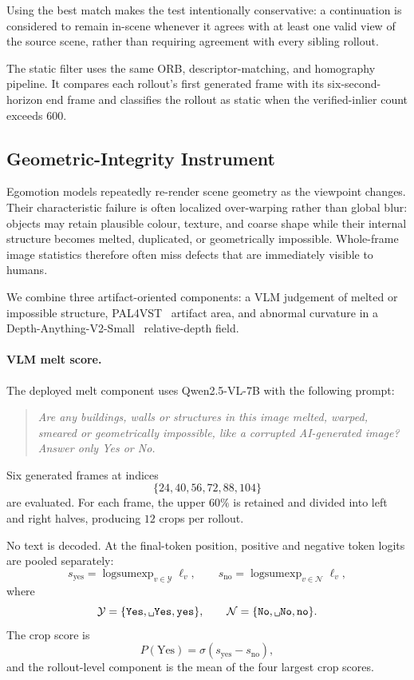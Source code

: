 \documentclass[letterpaper]{article} %
\begin{document}
Using the best match makes the test intentionally conservative: a continuation
is considered to remain in-scene whenever it agrees with at least one valid
view of the source scene, rather than requiring agreement with every sibling
rollout.

The static filter uses the same ORB, descriptor-matching, and homography
pipeline. It compares each rollout's first generated frame with its
six-second-horizon end frame and classifies the rollout as static when the
verified-inlier count exceeds $600$.


\subsection{Geometric-Integrity Instrument}
\label{app:geometry_instrument}

Egomotion models repeatedly re-render scene geometry as the viewpoint changes.
Their characteristic failure is often localized over-warping rather than
global blur: objects may retain plausible colour, texture, and coarse shape
while their internal structure becomes melted, duplicated, or geometrically
impossible. Whole-frame image statistics therefore often miss defects that
are immediately visible to humans.

We combine three artifact-oriented components: a VLM judgement of melted or
impossible structure, PAL4VST~\cite{pal} artifact area, and abnormal curvature
in a Depth-Anything-V2-Small~\cite{depthanything} relative-depth field.


\paragraph{VLM melt score.}

The deployed melt component uses Qwen2.5-VL-7B with the following prompt:

\begin{quote}
\small
\emph{Are any buildings, walls or structures in this image melted, warped,
smeared or geometrically impossible, like a corrupted AI-generated image?
Answer only Yes or No.}
\end{quote}

Six generated frames at indices
\[
\{24,40,56,72,88,104\}
\]
are evaluated. For each frame, the upper $60\%$ is retained and divided into
left and right halves, producing $12$ crops per rollout.

No text is decoded. At the final-token position, positive and negative token
logits are pooled separately:
\[
s_{\mathrm{yes}}
=
\operatorname{logsumexp}_{v\in\mathcal Y}\ell_v,
\qquad
s_{\mathrm{no}}
=
\operatorname{logsumexp}_{v\in\mathcal N}\ell_v,
\]
where
\[
\mathcal Y
=
\{\texttt{Yes},\texttt{\char32 Yes},\texttt{yes}\},
\qquad
\mathcal N
=
\{\texttt{No},\texttt{\char32 No},\texttt{no}\}.
\]
The crop score is
\[
P(\mathrm{Yes})
=
\sigma\!\left(s_{\mathrm{yes}}-s_{\mathrm{no}}\right),
\]
and the rollout-level component is the mean of the four largest crop scores.
\end{document}
